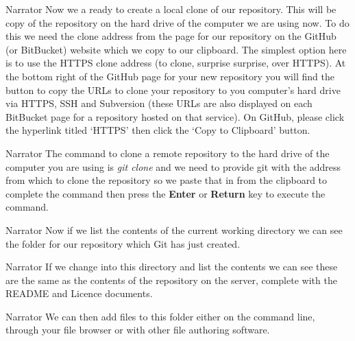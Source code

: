 \documentclass{screenplay} %
\begin{document}
\begin{dialogue}{Narrator}
Now we a ready to create a local clone of our repository.  
This will be copy of the repository on the hard drive of the computer we are using now.  
To do this we need the clone address from the page for our repository on the GitHub (or BitBucket) website which we copy to our clipboard.  
The simplest option here is to use the HTTPS clone address (to clone, surprise surprise, over HTTPS).
At the bottom right of the GitHub page for your new repository you will find the button to copy the URLs to clone your repository to you computer's hard drive via HTTPS, SSH and Subversion (these URLs are also displayed on each BitBucket page for a repository hosted on that service).
\newline
\newline
On GitHub, please click the hyperlink titled `HTTPS' then click the `Copy to Clipboard' button.
\end{dialogue}

\begin{dialogue}{Narrator}
The command to clone a remote repository to the hard drive of the computer you are using is \textit{git clone} and we need to provide git with the address from which to clone the repository so we paste that in from the clipboard to complete the command then press the \textbf{Enter} or \textbf{Return} key to execute the command.
\end{dialogue}

\begin{dialogue}{Narrator}
Now if we list the contents of the current working directory we can see the folder for our repository which Git has just created.
\end{dialogue}

\begin{dialogue}{Narrator}
If we change into this directory and list the contents we can see these are the same as the contents of the repository on the server, complete with the README and Licence documents.
\end{dialogue}

\begin{dialogue}{Narrator}
We can then add files to this folder either on the command line, through your file browser or with other file authoring software.
\end{dialogue}
\end{document}

